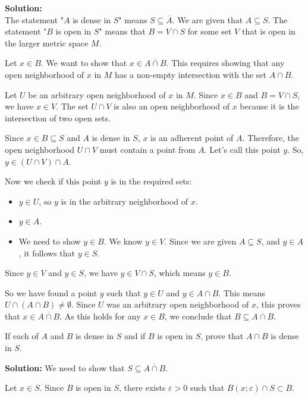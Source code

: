 \textbf{Solution:}\\
The statement "$A$ is dense in $S$" means $S \subseteq \overline{A}$. We are given that $A \subseteq S$.
The statement "$B$ is open in $S$" means that $B = V \cap S$ for some set $V$ that is open in the larger metric space $M$.

Let $x \in B$. We want to show that $x \in \overline{A \cap B}$. This requires showing that any open neighborhood of $x$ in $M$ has a non-empty intersection with the set $A \cap B$.

Let $U$ be an arbitrary open neighborhood of $x$ in $M$.
Since $x \in B$ and $B = V \cap S$, we have $x \in V$.
The set $U \cap V$ is also an open neighborhood of $x$ because it is the intersection of two open sets.

Since $x \in B \subseteq S$ and $A$ is dense in $S$, $x$ is an adherent point of $A$. Therefore, the open neighborhood $U \cap V$ must contain a point from $A$. Let's call this point $y$.
So, $y \in (U \cap V) \cap A$.

Now we check if this point $y$ is in the required sets:
\begin{itemize}
    \item $y \in U$, so $y$ is in the arbitrary neighborhood of $x$.
    \item $y \in A$.
    \item We need to show $y \in B$. We know $y \in V$. Since we are given $A \subseteq S$, and $y \in A$, it follows that $y \in S$.
\end{itemize}
Since $y \in V$ and $y \in S$, we have $y \in V \cap S$, which means $y \in B$.

So we have found a point $y$ such that $y \in U$ and $y \in A \cap B$. This means $U \cap (A \cap B) \neq \emptyset$.
Since $U$ was an arbitrary open neighborhood of $x$, this proves that $x \in \overline{A \cap B}$.
As this holds for any $x \in B$, we conclude that $B \subseteq \overline{A \cap B}$.


\begin{problembox}
If each of \( A \) and \( B \) is dense in \( S \) and if \( B \) is open in \( S \), prove that \( A \cap B \) is dense in \( S \).
\end{problembox}

\textbf{Solution:} We need to show that $S \subseteq \overline{A \cap B}$.

Let $x \in S$. Since $B$ is open in $S$, there exists $\varepsilon > 0$ such that $B(x;\varepsilon) \cap S \subset B$.

